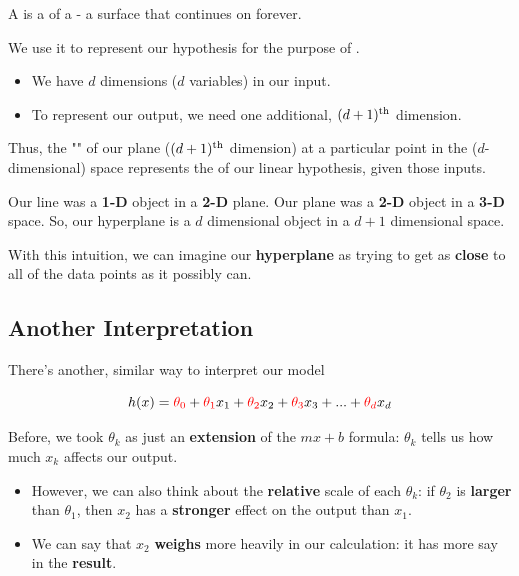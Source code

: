         \begin{definition}
            A  is a  of a  - a  surface that continues on forever.
            
            We use it to represent our  hypothesis for the purpose of . 

            \begin{itemize}
                \item We have $d$ dimensions ($d$ variables) in our input.
                \item To represent our output, we need one additional, $(d+1)^{ \text{th} }$ dimension.
            \end{itemize}

            Thus, the "" of our plane ($(d+1)^{ \text{th} }$ dimension) at a particular point in the ($d$-dimensional)  space represents the  of our linear hypothesis, given those inputs.
        \end{definition}
        
        Our line was a \textbf{1-D} object in a \textbf{2-D} plane. Our plane was a \textbf{2-D} object in a \textbf{3-D} space. So, our hyperplane is a $d$ dimensional object in a $d+1$ dimensional space.
        
        With this intuition, we can imagine our \textbf{hyperplane} as trying to get as \textbf{close} to all of the data points as it possibly can.
        
    \subsection{Another Interpretation}
    
        There's another, similar way to interpret our model
        
        \begin{equation}
            h(x) = \textcolor{red}{\theta_0} + \textcolor{red}{\theta_1}x_1 + \textcolor{red}{\theta_2}x_2 + \textcolor{red}{\theta_3}x_3 + ... + \textcolor{red}{\theta_d}x_d
        \end{equation}
        
        Before, we took $\theta_k$ as just an \textbf{extension} of the $mx+b$ formula: $\theta_k$ tells us how much $x_k$ affects our output.

        \begin{itemize}
            \item However, we can also think about the \textbf{relative} scale of each $\theta_k$: if $\theta_2$ is \textbf{larger} than $\theta_1$, then $x_2$ has a \textbf{stronger} effect on the output than $x_1$.
            \item We can say that $x_2$ \textbf{weighs} more heavily in our calculation: it has more say in the \textbf{result}.
        \end{itemize}
        
